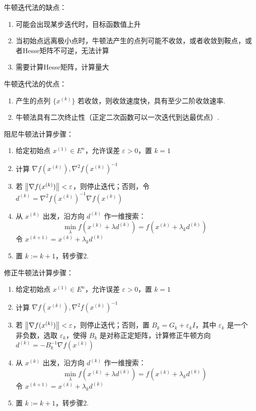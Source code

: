 \begin{note}
    牛顿迭代法的缺点：\begin{enumerate}
        \item 可能会出现某步迭代时，目标函数值上升
        \item 当初始点远离极小点时，牛顿法产生的点列可能不收敛，或者收敛到鞍点，或者Hesse矩阵不可逆，无法计算
        \item 需要计算Hesse矩阵，计算量大
    \end{enumerate}
    牛顿迭代法的优点：\begin{enumerate}
        \item 产生的点列 $\{x^{(k)}\}$ 若收敛，则收敛速度快，具有至少二阶收敛速率.
        \item 牛顿法具有二次终止性（正定二次函数可以一次迭代到达最优点）.
    \end{enumerate}
\end{note}

\begin{note}
    阻尼牛顿法计算步骤：\begin{enumerate}
        \item 给定初始点 $x^{(1)} \in E^n$，允许误差 $\varepsilon > 0$，置 $k = 1$
        \item 计算 $\nabla f(x^{(k)}), \nabla^2f(x^{(k)})^{-1}$
        \item 若 $\norm{\nabla f(x^{(k)})} < \varepsilon$，则停止迭代；否则，令 $d^{(k)} = \nabla^2f(x^{(k)})^{-1}\nabla f(x^{(k)})$
        \item 从 $x^{(k)}$ 出发，沿方向 $d^{(k)}$ 作一维搜索：\[\min_{\lambda} f(x^{(k)} + \lambda d^{(k)}) = f(x^{(k)} + \lambda_k d^{(k)})\] 令 $x^{(k + 1)} = x^{(k)} + \lambda_k d^{(k)}$
        \item 置 $k := k + 1$，转步骤2.
    \end{enumerate}
\end{note}

\begin{note}
    修正牛顿法计算步骤：\begin{enumerate}
        \item 给定初始点 $x^{(1)} \in E^n$，允许误差 $\varepsilon > 0$，置 $k = 1$
        \item 计算 $\nabla f(x^{(k)}), \nabla^2f(x^{(k)})^{-1}$
        \item 若 $\norm{\nabla f(x^{(k)})} < \varepsilon$，则停止迭代；否则，置 $B_k = G_k + \varepsilon_k I$，其中 $\varepsilon_k$ 是一个非负数，选取 $\varepsilon_k$，使得 $B_k$ 是对称正定矩阵，计算修正牛顿方向 $d^{(k)} = -B_k^{-1}\nabla f(x^{(k)})$
        \item 从 $x^{(k)}$ 出发，沿方向 $d^{(k)}$ 作一维搜索：\[\min_{\lambda} f(x^{(k)} + \lambda d^{(k)}) = f(x^{(k)} + \lambda_k d^{(k)})\] 令 $x^{(k + 1)} = x^{(k)} + \lambda_k d^{(k)}$
        \item 置 $k := k + 1$，转步骤2.
    \end{enumerate}
\end{note}

